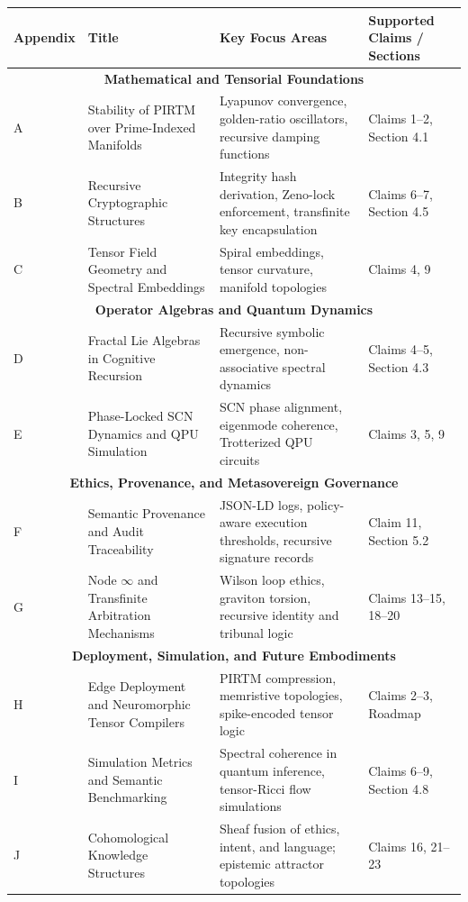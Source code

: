 \documentclass[12pt]{article}
\begin{document}
\begin{itemize}
\begin{longtable}{|p{1.8cm}|p{4.4cm}|p{4.2cm}|p{3.8cm}|}
\hline
\textbf{Appendix} & \textbf{Title} & \textbf{Key Focus Areas} & \textbf{Supported Claims / Sections} \\
\hline
\multicolumn{4}{|c|}{\textbf{Mathematical and Tensorial Foundations}} \\
\hline
A & Stability of PIRTM over Prime-Indexed Manifolds & Lyapunov convergence, golden-ratio oscillators, recursive damping functions & Claims 1–2, Section 4.1 \\
\hline
B & Recursive Cryptographic Structures & Integrity hash derivation, Zeno-lock enforcement, transfinite key encapsulation & Claims 6–7, Section 4.5 \\
\hline
C & Tensor Field Geometry and Spectral Embeddings & Spiral embeddings, tensor curvature, manifold topologies & Claims 4, 9 \\
\hline
\multicolumn{4}{|c|}{\textbf{Operator Algebras and Quantum Dynamics}} \\
\hline
D & Fractal Lie Algebras in Cognitive Recursion & Recursive symbolic emergence, non-associative spectral dynamics & Claims 4–5, Section 4.3 \\
\hline
E & Phase-Locked SCN Dynamics and QPU Simulation & SCN phase alignment, eigenmode coherence, Trotterized QPU circuits & Claims 3, 5, 9 \\
\hline
\multicolumn{4}{|c|}{\textbf{Ethics, Provenance, and Metasovereign Governance}} \\
\hline
F & Semantic Provenance and Audit Traceability & JSON-LD logs, policy-aware execution thresholds, recursive signature records & Claim 11, Section 5.2 \\
\hline
G & Node \( \infty \) and Transfinite Arbitration Mechanisms & Wilson loop ethics, graviton torsion, recursive identity and tribunal logic & Claims 13–15, 18–20 \\
\hline
\multicolumn{4}{|c|}{\textbf{Deployment, Simulation, and Future Embodiments}} \\
\hline
H & Edge Deployment and Neuromorphic Tensor Compilers & PIRTM compression, memristive topologies, spike-encoded tensor logic & Claims 2–3, Roadmap \\
\hline
I & Simulation Metrics and Semantic Benchmarking & Spectral coherence in quantum inference, tensor-Ricci flow simulations & Claims 6–9, Section 4.8 \\
\hline
J & Cohomological Knowledge Structures & Sheaf fusion of ethics, intent, and language; epistemic attractor topologies & Claims 16, 21–23 \\
\hline
\end{longtable}


\end{itemize}
\end{document}
